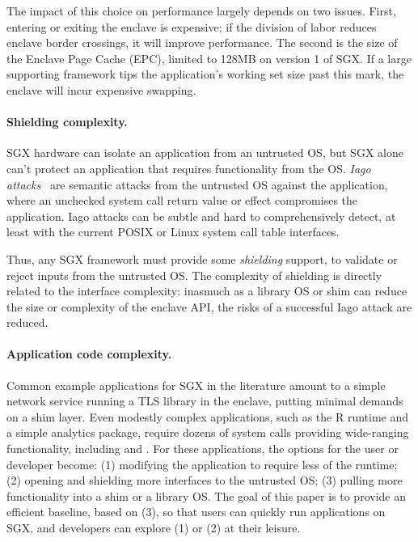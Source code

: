 The impact of this choice on performance
largely depends on two issues. First, entering or exiting the enclave 
is expensive; if the division of labor reduces enclave border crossings, 
it will improve performance.
The second is the size of the Enclave Page Cache (EPC),
limited to 128MB on version 1 of SGX.
If a large supporting framework tips the application's working set size
past this mark, the enclave will incur expensive swapping.


\paragraph{Shielding complexity.}
SGX hardware can isolate an application from an untrusted OS, but 
SGX alone can't protect an application that  requires
functionality from the OS.  {\em Iago attacks}~\cite{checkoway13iago}
are semantic attacks from the untrusted OS against the application, where an unchecked system call return 
value or effect compromises the application.
Iago attacks can be subtle and hard to comprehensively detect, at least with the current
POSIX or Linux system call table interfaces.

Thus, any SGX framework must provide some {\em shielding} support, to 
validate or reject inputs from the untrusted OS.  
The complexity of shielding is directly related to the interface complexity:
inasmuch as a library OS or shim can reduce the size or complexity of the 
enclave API, 
the risks of a successful Iago attack are reduced.

\paragraph{Application code complexity.}
Common example applications for SGX in the literature 
amount to a simple network service running a TLS
library in the enclave, putting minimal demands on a shim layer. 
Even modestly complex applications, such as the R runtime and a simple
analytics package, require dozens of system calls providing wide-ranging functionality, 
including  and .
For these applications, the options for the user or developer become: 
(1) modifying the application to require less of the runtime; (2) opening and shielding more 
interfaces to the untrusted OS; (3) pulling more functionality into a shim or a library OS.
The goal of this paper is to provide an efficient baseline, based on (3),
so that users can quickly run applications on SGX, and developers can 
explore (1) or (2) at their leisure.

